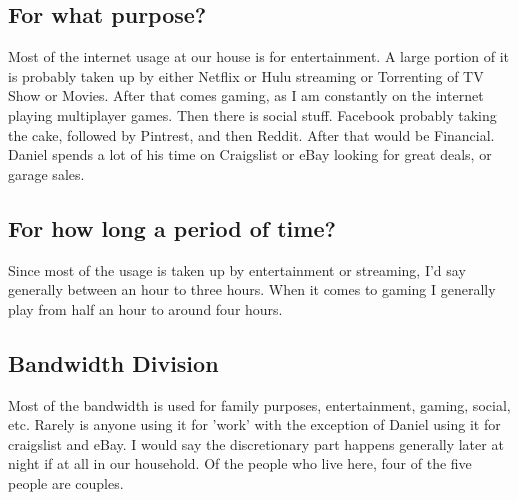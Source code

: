 \documentclass[12pt,letterpaper]{article}
\begin{document}
\subsection{For what purpose?}
Most of the internet usage at our house is for entertainment. A large
portion of it is probably taken up by either Netflix or Hulu streaming or
Torrenting of TV Show or Movies. After that comes gaming, as I am
constantly on the internet playing multiplayer games. Then there is
social stuff. Facebook probably taking the cake, followed by Pintrest,
and then Reddit. After that would be Financial. Daniel spends a lot of
his time on Craigslist or eBay looking for great deals, or garage sales.

\subsection{For how long a period of time?}
Since most of the usage is taken up by entertainment or streaming, I'd
say generally between an hour to three hours. When it comes to gaming I
generally play from half an hour to around four hours.

\subsection{Bandwidth Division}
Most of the bandwidth is used for family purposes, entertainment,
gaming, social, etc. Rarely is anyone using it for 'work' with the
exception of Daniel using it for craigslist and eBay. I would say the
discretionary part happens generally later at night if at all in our
household. Of the people who live here, four of the five people are
couples.
\end{document}
